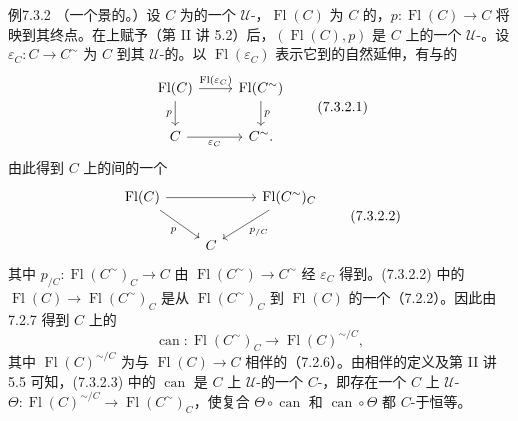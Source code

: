 \begin{SGAresult}{例}{7.3.2}
（一个景的。）设 $C$ 为的一个 $\mathcal U$-，$\operatorname{Fl}(C)$ 为 $C$ 的，$p:\operatorname{Fl}(C)\to C$ 将映到其终点。在上赋予（第 II 讲 5.2）后，$(\operatorname{Fl}(C),p)$ 是 $C$ 上的一个 $\mathcal U$-。设 $\varepsilon_C:C\to C^\sim$ 为 $C$ 到其 $\mathcal U$-的。以 $\operatorname{Fl}(\varepsilon_C)$ 表示它到的自然延伸，有与的
\[\begin{tikzcd}
\operatorname{Fl}(C)\arrow[r,"\operatorname{Fl}(\varepsilon_C)"]\arrow[d,"p"']&\operatorname{Fl}(C^\sim)\arrow[d,"p"]\\
C\arrow[r,"\varepsilon_C"']&C^\sim.
\end{tikzcd}\tag{7.3.2.1}\]
由此得到 $C$ 上的间的一个
\[\begin{tikzcd}
\operatorname{Fl}(C)\arrow[rr]\arrow[dr,"p"']&&\operatorname{Fl}(C^\sim)_C\arrow[dl,"p_{/C}"]\\
&C&
\end{tikzcd}\tag{7.3.2.2}\]
其中 $p_{/C}:\operatorname{Fl}(C^\sim)_C\to C$ 由 $\operatorname{Fl}(C^\sim)\to C^\sim$ 经 $\varepsilon_C$ 得到。(7.3.2.2) 中的 $\operatorname{Fl}(C)\to\operatorname{Fl}(C^\sim)_C$ 是从 $\operatorname{Fl}(C^\sim)_C$ 到 $\operatorname{Fl}(C)$ 的一个（7.2.2）。因此由 7.2.7 得到 $C$ 上的
\[\operatorname{can}:\operatorname{Fl}(C^\sim)_C\longrightarrow\operatorname{Fl}(C)^{\sim/C},\tag{7.3.2.3}\]
其中 $\operatorname{Fl}(C)^{\sim/C}$ 为与 $\operatorname{Fl}(C)\to C$ 相伴的（7.2.6）。由相伴的定义及第 II 讲 5.5 可知，(7.3.2.3) 中的 $\operatorname{can}$ 是 $C$ 上 $\mathcal U$-的一个 $C$-，即存在一个 $C$ 上 $\mathcal U$-
$\Theta:\operatorname{Fl}(C)^{\sim/C}\to\operatorname{Fl}(C^\sim)_C$，使复合 $\Theta\circ\operatorname{can}$ 和 $\operatorname{can}\circ\Theta$ 都 $C$-于恒等。


\end{SGAresult}
